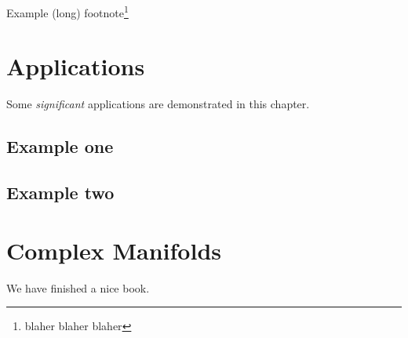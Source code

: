 \documentclass[
]{book}
\begin{document}
Example (long) footnote\footnote{blaher blaher blaher}

\hypertarget{applications}{%
\chapter{Applications}\label{applications}}

Some \emph{significant} applications are demonstrated in this chapter.

\hypertarget{example-one}{%
\section{Example one}\label{example-one}}

\hypertarget{example-two}{%
\section{Example two}\label{example-two}}

\hypertarget{complex-manifolds}{%
\chapter{Complex Manifolds}\label{complex-manifolds}}

We have finished a nice book.

  
\end{document}
